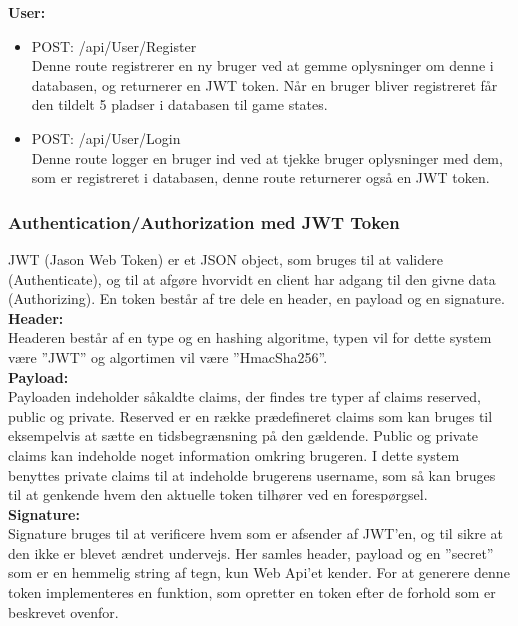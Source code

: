 \textbf{User:}\\
\begin{itemize}
\item POST: /api/User/Register\\
Denne route registrerer en ny bruger ved at gemme oplysninger om denne i databasen, og returnerer en JWT token. Når en bruger bliver registreret får den tildelt 5 pladser i databasen til game states.
\item POST: /api/User/Login\\
Denne route logger en bruger ind ved at tjekke bruger oplysninger med dem, som er registreret i databasen, denne route returnerer også en JWT token.
\end{itemize}


\subsubsection{Authentication/Authorization med JWT Token}
JWT (Jason Web Token) er et JSON object, som bruges til at validere (Authenticate), og til at afgøre hvorvidt en client har adgang til den givne data (Authorizing). En token består af tre dele en header, en payload og en signature.\\

\textbf{Header:}\\
Headeren består af en type og en hashing algoritme, typen vil for dette system være ”JWT” og algortimen vil være ”HmacSha256”.\\

\textbf{Payload:}\\

Payloaden indeholder såkaldte claims, der findes tre typer af claims reserved, public og private. Reserved er en række prædefineret claims som kan bruges til eksempelvis at sætte en tidsbegrænsning på den gældende. Public og private claims kan indeholde noget information omkring brugeren. I dette system benyttes private claims til at indeholde brugerens username, som så kan bruges til at genkende hvem den aktuelle token tilhører ved en forespørgsel.\\

\textbf{Signature:}\\
Signature bruges til at verificere hvem som er afsender af JWT’en, og til sikre at den ikke er blevet ændret undervejs. Her samles header, payload og en ”secret” som er en hemmelig string af tegn, kun Web Api'et kender.
For at generere denne token implementeres en funktion, som opretter en token efter de forhold som er beskrevet ovenfor.\\


